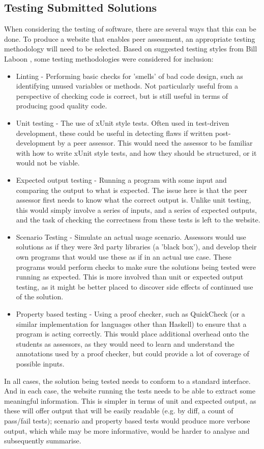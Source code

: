 \documentclass[a4paper,11pt]{report}
\begin{document}
\subsection{Testing Submitted Solutions}
When considering the testing of software, there are several ways that this can be done. To produce a website that enables peer assessment, an appropriate testing methodology will need to be selected. Based on suggested testing styles from Bill Laboon \cite{laboon_friendly_2016}, some testing methodologies were considered for inclusion:
\begin{itemize}
 \item Linting - Performing basic checks for 'smells' of bad code design, such as identifying unused variables or methods. Not particularly useful from a perspective of checking code is correct, but is still useful in terms of producing good quality code.
 \item Unit testing - The use of xUnit style tests. Often used in test-driven development, these could be useful in detecting flaws if written post-development by a peer assessor. This would need the assessor to be familiar with how to write xUnit style tests, and how they should be structured, or it would not be viable.
 \item Expected output testing - Running a program with some input and comparing the output to what is expected. The issue here is that the peer assessor first needs to know what the correct output is. Unlike unit testing, this would simply involve a series of inputs, and a series of expected outputs, and the task of checking the correctness from these tests is left to the website.
 \item Scenario Testing - Simulate an actual usage scenario. Assessors would use solutions as if they were 3rd party libraries (a 'black box'), and develop their own programs that would use these as if in an actual use case. These programs would perform checks to make sure the solutions being tested were running as expected. This is more involved than unit or expected output testing, as it might be better placed to discover side effects of continued use of the solution.
 \item Property based testing - Using a proof checker, such as QuickCheck (or a similar implementation for languages other than Haskell) to ensure that a program is acting correctly. This would place additional overhead onto the students as assessors, as they would need to learn and understand the annotations used by a proof checker, but could provide a lot of coverage of possible inputs.
\end{itemize}
In all cases, the solution being tested needs to conform to a standard interface. And in each case, the website running the tests needs to be able to extract some meaningful information. This is simpler in terms of unit and expected output, as these will offer output that will be easily readable (e.g. by diff, a count of pass/fail tests); scenario and property based tests would produce more verbose output, which while may be more informative, would be harder to analyse and subsequently summarise. 
\end{document}
